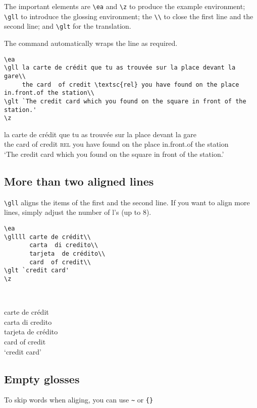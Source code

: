 \documentclass[output=paper]{langscibook}
\newcommand{\cmd}[1]{\texttt{\textbackslash#1}}
\begin{document}
The important elements are \cmd{ea} and \cmd{z} to produce the example environment; \cmd{gll} to introduce the glossing environment; the \texttt{\textbackslash\textbackslash} to close the first line and the second line; and \cmd{glt} for the translation.

The command automatically wraps the line as required.
\begin{lstlisting}
\ea
\gll la carte de crédit que tu as trouvée sur la place devant la gare\\
     the card  of credit \textsc{rel} you have found on the place in.front.of the station\\
\glt `The credit card which you found on the square in front of the station.'
\z
 \end{lstlisting}
\ea
\gll la carte de crédit que tu as trouvée sur la place devant la gare\\
     the card  of credit \textsc{rel} you have found on the place in.front.of the station\\
\glt `The credit card which you found on the square in front of the station.'
\z



\subsection{More than two aligned lines}
\cmd{gll} aligns the items of the first and the second line. If you want to align more lines, simply adjust the number of l's (up to 8).


\begin{minipage}[t]{.55\textwidth}
\begin{lstlisting}
\ea
\gllll carte de crédit\\
       carta  di credito\\
       tarjeta  de crédito\\
       card  of credit\\
\glt `credit card'
\z
 \end{lstlisting}
\end{minipage}~
\parbox[t]{.45\textwidth}{
\ea
\gllll carte de crédit\\
       carta  di credito\\
       tarjeta  de crédito\\
       card  of credit\\
\glt `credit card'
\z
}


\subsection{Empty glosses}
To skip words when aliging, you can use \texttt{\textasciitilde} or \texttt{\{\}}
\end{document}
